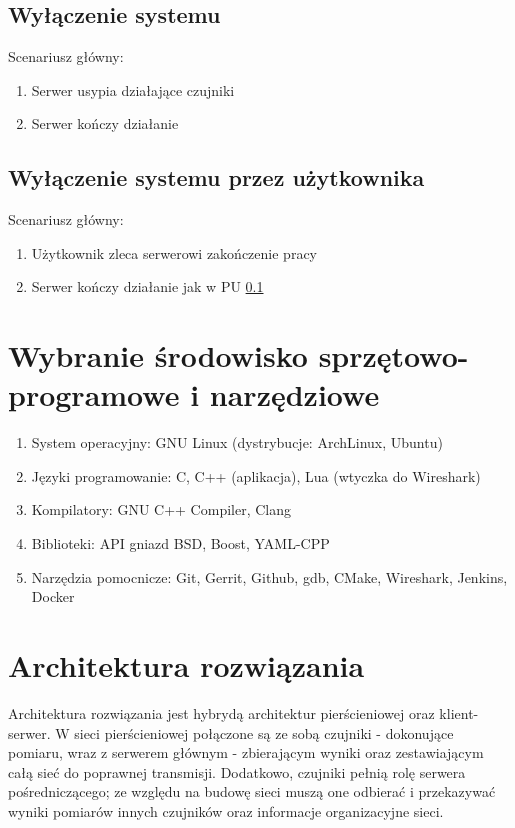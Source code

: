 \documentclass[a4paper,11pt]{article}
\begin{document}
\subsection{Wyłączenie systemu}\label{turnoff}
Scenariusz główny:
\begin{enumerate}
   \item Serwer usypia działające czujniki
   \item Serwer kończy działanie
\end{enumerate}

\subsection{Wyłączenie systemu przez użytkownika}
Scenariusz główny:
\begin{enumerate}
   \item Użytkownik zleca serwerowi zakończenie pracy
   \item Serwer kończy działanie jak w PU \ref{turnoff}
\end{enumerate}

\section{Wybranie środowisko sprzętowo-programowe i narzędziowe}

\begin{enumerate}
  \item System operacyjny: GNU Linux (dystrybucje: ArchLinux, Ubuntu)
  \item Języki programowanie: C, C++ (aplikacja), Lua (wtyczka do Wireshark)
  \item Kompilatory: GNU C++ Compiler, Clang
  \item Biblioteki: API gniazd BSD, Boost, YAML-CPP
  \item Narzędzia pomocnicze: Git, Gerrit, Github, gdb, CMake, Wireshark, Jenkins, Docker
\end{enumerate}

\newpage
\section{Architektura rozwiązania}
Architektura rozwiązania jest hybrydą architektur pierścieniowej oraz klient-serwer.
W sieci pierścieniowej połączone są ze sobą czujniki - dokonujące pomiaru, wraz z serwerem głównym -
zbierającym wyniki oraz zestawiającym całą sieć do poprawnej transmisji. Dodatkowo,
czujniki pełnią rolę serwera pośredniczącego; ze względu na budowę sieci muszą one
odbierać i przekazywać wyniki pomiarów innych czujników oraz informacje organizacyjne sieci.
\end{document}
